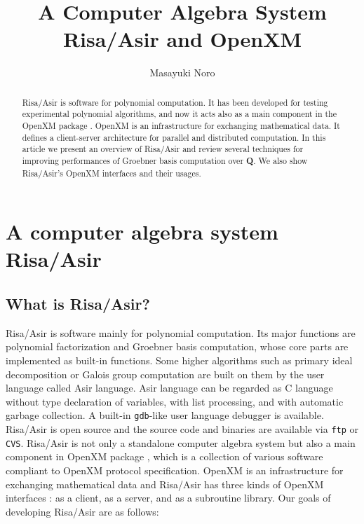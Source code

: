 \documentclass[runningheads]{cl2emult}
\begin{document}
%
\title*{A Computer Algebra System Risa/Asir and OpenXM}
%
%
%
%
%
\author{Masayuki Noro}
%
%
%

\maketitle              %

\begin{abstract}
Risa/Asir is software for polynomial computation. It has been
developed for testing experimental polynomial algorithms, and now it
acts also as a main component in the OpenXM package \cite{OPENXM}.
OpenXM is an infrastructure for exchanging mathematical
data.  It defines a client-server architecture for parallel and
distributed computation. In this article we present an overview of
Risa/Asir and review several techniques for improving performances of
Groebner basis computation over {\bf Q}. We also show Risa/Asir's
OpenXM interfaces and their usages.
\end{abstract}

\section{A computer algebra system Risa/Asir}

\subsection{What is Risa/Asir?}

Risa/Asir \cite{RISA} is software mainly for polynomial
computation. Its major functions are polynomial factorization and
Groebner basis computation, whose core parts are implemented as
built-in functions.  Some higher algorithms such as primary ideal
decomposition or Galois group computation are built on them by the
user language called Asir language. Asir language can be regarded as C
language without type declaration of variables, with list processing,
and with automatic garbage collection. A built-in {\tt gdb}-like user
language debugger is available. Risa/Asir is open source and the
source code and binaries are available via {\tt ftp} or {\tt CVS}.
Risa/Asir is not only a standalone computer algebra system but also a
main component in OpenXM package \cite{OPENXM}, which is a collection
of various software compliant to OpenXM protocol specification.
OpenXM is an infrastructure for exchanging mathematical data and
Risa/Asir has three kinds of OpenXM interfaces : as a client, as a
server, and as a subroutine library. Our goals of developing Risa/Asir
are as follows:
\end{document}
